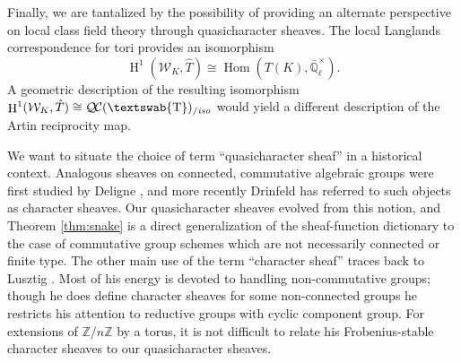 \documentclass[11pt]{amsart}
\newcommand{\mathswab}[1]{\operatorname{\textswab{#1}}}
\theoremstyle{plain}
\theoremstyle{definition}
\theoremstyle{remark}
\newcommand{\ZZ}{{\mathbb{Z}}}
\newcommand{\EE}{\mathbb{\bar Q}_\ell}
\newcommand{\EEx}{\EE^\times}
\DeclareMathOperator{\Hom}{Hom}
\DeclareMathOperator{\Hh}{H}
\newcommand{\GN}[1]{\mathswab{#1}}
\newcommand{\QC}{{\mathcal{Q\hskip-0.8pt C}}}
\newcommand{\QCiso}[1]{\QC(#1)_{/\textit{iso}}}
\newcommand{\Weil}[1]{\mathcal{W}_{#1}}
\begin{document}
Finally, we are tantalized by the possibility of providing an alternate perspective on local class field theory
through quasicharacter sheaves.  The local Langlands correspondence for tori provides an isomorphism
\[
\Hh^1(\Weil{K}, \hat{T}) \cong \Hom(T(K), \EEx).
\]
A geometric description of the resulting isomorphism $\Hh^1(\Weil{K}, \hat{T}) \cong \QCiso{\GN{T}}$
would yield a different description of the Artin reciprocity map.

We want to situate the choice of term ``quasicharacter sheaf'' in a historical context.
Analogous sheaves on connected, commutative algebraic groups were first studied
by Deligne \cite{SGA4.5}, and more recently Drinfeld has referred to such objects
as character sheaves.  Our quasicharacter sheaves evolved from this notion, and Theorem \ref{thm:snake}
is a direct generalization of the sheaf-function dictionary to the case of commutative
group schemes which are not necessarily connected or finite type.  The other main use
of the term ``character sheaf'' traces back to Lusztig \cite{}.  Most of his energy is devoted to
handling non-commutative groups; though he does define character sheaves for some
non-connected groups he restricts his attention to reductive groups with cyclic component group.
For extensions of $\ZZ/n\ZZ$ by a torus, it is not difficult to relate his Frobenius-stable character
sheaves to our quasicharacter sheaves.
\end{document}
